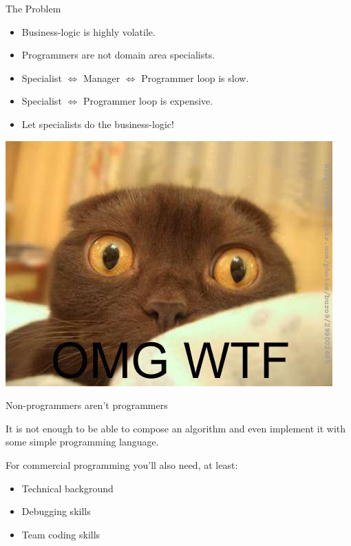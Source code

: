 \documentclass[handout]{beamer}
\begin{document}

\begin{frame}{The Problem}

\begin{itemize}
\item Business-logic is highly volatile.
\item Programmers are not domain area specialists.
\item Specialist $\Leftrightarrow$ Manager $\Leftrightarrow$ Programmer
loop is slow.
\item Specialist $\Leftrightarrow$ Programmer loop is expensive.
\item Let specialists do the business-logic!
\end{itemize}

\end{frame}


\begin{frame}

\includegraphics[height=.8\textheight]{omgwtf}

\end{frame}


\begin{frame}{Non-programmers aren't programmers}

It is not enough to be able to compose an algorithm and even implement it
with some simple programming language.

For commercial programming you'll also need, at least:

\begin{itemize}
\item Technical background
\item Debugging skills
\item Team coding skills
\end{itemize}

\end{frame}
\end{document}

